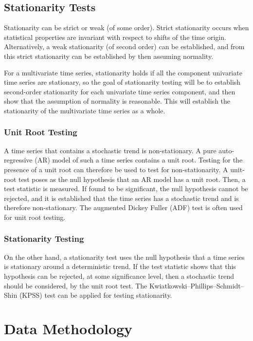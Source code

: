 \documentclass[a4paper]{scrartcl}
\begin{document}
\subsection*{Stationarity Tests}
Stationarity can be strict or weak (of some order). Strict stationarity occurs when statistical properties are invariant with respect to shifts of the time origin\cite{moon2000mathematical}. Alternatively, a weak stationarity (of second order) can be established, and from this strict stationarity can be established by then assuming normality\cite{box_jenkins_reinsel_2008}.

For a multivariate time series, stationarity holds if all the component univariate time series are stationary\cite{yang2005stationarity}, so the goal of stationarity testing will be to establish second-order stationarity for each univariate time series component, and then show that the assumption of normality is reasonable. This will establish the stationarity of the multivariate time series as a whole.

\subsubsection*{Unit Root Testing}
A time series that contains a stochastic trend is non-stationary. A pure auto-regressive (AR) model of such a time series contains a unit root\cite{franses1998time}. Testing for the presence of a unit root can therefore be used to test for non-stationarity. A unit-root test poses as the null hypothesis that an AR model has a unit root. Then, a test statistic is measured. If found to be significant, the null hypothesis cannot be rejected, and it is established that the time series has a stochastic trend and is therefore non-stationary. The augmented Dickey Fuller (ADF) test is often used for unit root testing.

\subsubsection*{Stationarity Testing}
On the other hand, a stationarity test uses the null hypothesis that a time series is stationary around a deterministic trend. If the test statistic shows that this hypothesis can be rejected, at some significance level, then a stochastic trend should be considered, by the unit root test. The Kwiatkowski–Phillips–Schmidt–Shin (KPSS) test can be applied for testing stationarity.

\section*{Data Methodology}
\label{sec:data_methodology}
\end{document}

